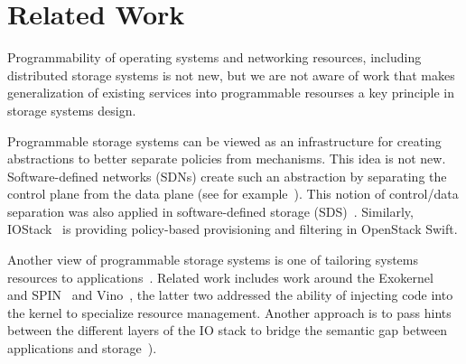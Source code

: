 \documentclass[preprint]{sigplanconf-eurosys}
\begin{document}
%
%
%

\section{Related Work}


Programmability of operating systems and networking resources, including
distributed storage systems is not new, but we are not aware of work that makes
generalization of existing services into programmable resourses a key principle
in storage systems design. 

Programmable storage systems can be viewed as an infrastructure for creating
abstractions to better separate policies from mechanisms. This idea is not new.
Software-defined networks (SDNs) create such an abstraction by separating the
control plane from the data plane (see for example~\cite{jain:sigcomm13}). This
notion of control/data separation was also applied in software-defined storage
(SDS)~\cite{arpaci:sosp01,thereska:sosp13,stefanovici:fast16}. Similarly,
IOStack~\cite{gracia:internet16} is providing policy-based provisioning and
filtering in OpenStack Swift. 

Another view of programmable storage systems is one of tailoring systems
resources to applications~\cite{arpaci:sosp01}. Related work includes work
around the Exokernel~\cite{engler:sosp95} and SPIN~\cite{bershad:sosp95} and
Vino~\cite{seltzer:osdi96}, the latter two addressed the ability of injecting
code into the kernel to specialize resource management. Another approach is to
pass hints between the different layers of the IO stack to bridge the semantic
gap between applications and
storage~\cite{arpaci:sosp01,sivathanu:fast03,mesnier:sosp11}).
\end{document}
